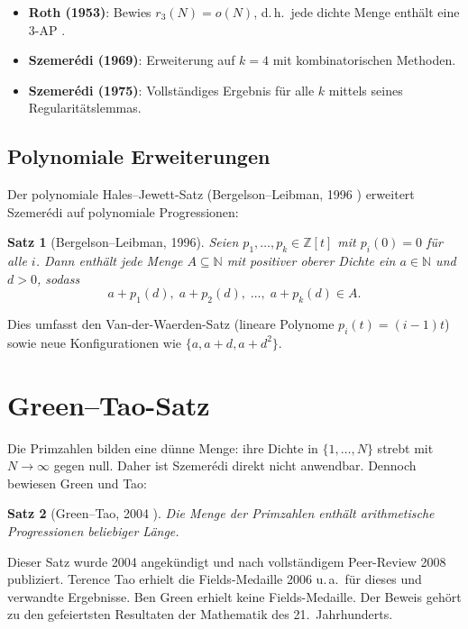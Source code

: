 \documentclass[12pt,a4paper]{amsart}
\newtheorem{theorem}{Satz}[section]
\theoremstyle{definition}
\newcommand{\N}{\mathbb{N}}
\newcommand{\Z}{\mathbb{Z}}
\begin{document}
\begin{itemize}
\item \textbf{Roth (1953)}: Bewies $r_3(N) = o(N)$, d.\,h.\ jede dichte Menge
  enthält eine $3$-AP \cite{Roth1953}.
\item \textbf{Szemerédi (1969)}: Erweiterung auf $k=4$ mit kombinatorischen Methoden.
\item \textbf{Szemerédi (1975)}: Vollständiges Ergebnis für alle $k$ mittels seines
  Regularitätslemmas.
\end{itemize}

\subsection{Polynomiale Erweiterungen}

Der polynomiale Hales--Jewett-Satz (Bergelson--Leibman, 1996
\cite{BergelsonLeibman1996}) erweitert Szemerédi auf polynomiale Progressionen:

\begin{theorem}[Bergelson--Leibman, 1996]
Seien $p_1, \ldots, p_k \in \Z[t]$ mit $p_i(0) = 0$ für alle $i$. Dann enthält
jede Menge $A \subseteq \N$ mit positiver oberer Dichte ein $a \in \N$ und $d > 0$, sodass
\[
  a + p_1(d),\; a + p_2(d),\; \ldots,\; a + p_k(d) \in A.
\]
\end{theorem}

Dies umfasst den Van-der-Waerden-Satz (lineare Polynome $p_i(t) = (i-1)t$) sowie
neue Konfigurationen wie $\{a, a+d, a+d^2\}$.

\section{Green--Tao-Satz}\label{sec:green-tao}

Die Primzahlen bilden eine dünne Menge: ihre Dichte in $\{1,\ldots,N\}$ strebt mit
$N \to \infty$ gegen null. Daher ist Szemerédi direkt nicht anwendbar. Dennoch bewiesen
Green und Tao:

\begin{theorem}[Green--Tao, 2004 \cite{GreenTao2008}]\label{satz:gt}
Die Menge der Primzahlen enthält arithmetische Progressionen beliebiger Länge.
\end{theorem}

Dieser Satz wurde 2004 angekündigt und nach vollständigem Peer-Review 2008 publiziert.
Terence Tao erhielt die Fields-Medaille 2006 u.\,a.\ für dieses
und verwandte Ergebnisse. Ben Green erhielt keine Fields-Medaille. Der Beweis gehört zu den gefeiertsten Resultaten der
Mathematik des 21.\ Jahrhunderts.
\end{document}
